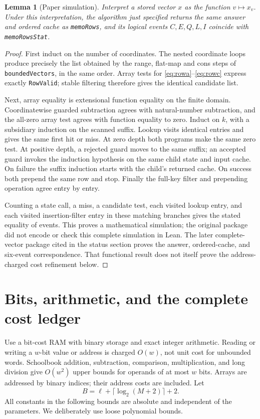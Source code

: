 \documentclass[11pt,a4paper]{article}
\newtheorem{lemma}[theorem]{Lemma}
\theoremstyle{definition}
\theoremstyle{remark}
\begin{document}
\begin{lemma}[Paper simulation]\label{lem:simulation}
Interpret a stored vector \(x\) as the function \(v\mapsto x_v\).
Under this interpretation, the algorithm just specified returns the same
answer and ordered cache as \texttt{memoRows}, and its logical events
\(C,E,Q,L,I\) coincide with \texttt{memoRowsStat}.
\end{lemma}
\begin{proof}
First induct on the number of coordinates. The nested coordinate loops
produce precisely the list obtained by the range, flat-map and cons steps
of \texttt{boundedVectors}, in the same order. Array tests for
\eqref{eq:rowa}--\eqref{eq:rowc} express exactly \texttt{RowValid}; stable
filtering therefore gives the identical candidate list.

Next, array equality is extensional function equality on the finite domain.
Coordinatewise guarded subtraction agrees with natural-number subtraction,
and the all-zero array test agrees with function equality to zero.
Induct on \(k\), with a subsidiary induction on the scanned suffix.
Lookup visits identical entries and gives the same first hit or miss.
At zero depth both programs make the same zero test. At positive depth,
a rejected guard moves to the same suffix; an accepted guard invokes the
induction hypothesis on the same child state and input cache. On failure
the suffix induction starts with the child's returned cache. On success
both prepend the same row and stop. Finally the full-key filter and
prepending operation agree entry by entry.

Counting a state call, a miss, a candidate test, each visited lookup entry,
and each visited insertion-filter entry in these matching branches gives
the stated equality of events. This proves a mathematical simulation;
the original package did not encode or check this complete simulation in Lean.
The later complete-vector package cited in the status section proves the
answer, ordered-cache, and six-event correspondence. That functional result
does not itself prove the address-charged cost refinement below.
\end{proof}

\section{Bits, arithmetic, and the complete cost ledger}\label{sec:ledger}
Use a bit-cost RAM with binary storage and exact integer arithmetic.
Reading or writing a \(w\)-bit value or address is charged \(O(w)\),
not unit cost for unbounded words. Schoolbook addition, subtraction,
comparison, multiplication, and long division give \(O(w^2)\) upper bounds
for operands of at most \(w\) bits. Arrays are addressed by binary indices;
their address costs are included. Let
\[
 B=\ell+\lceil\log_2(M+2)\rceil+2.
\]
All constants in the following bounds are absolute and independent of
the parameters. We deliberately use loose polynomial bounds.
\end{document}
